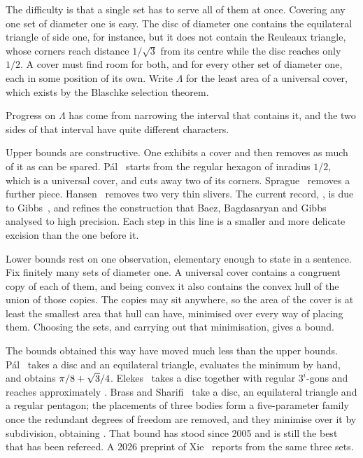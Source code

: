 \documentclass[a4paper,UKenglish,cleveref,autoref,thm-restate,numberwithinsect]{lipics-v2021}
\begin{document}
The difficulty is that a single set has to serve all of them at once. Covering
any one set of diameter one is easy. The disc of diameter one contains the
equilateral triangle of side one, for instance, but it does not contain the
Reuleaux triangle, whose corners reach distance $1/\sqrt3$ from its centre while
the disc reaches only $1/2$. A cover must find room for both, and for every other
set of diameter one, each in some position of its own. Write $\Lambda$ for the
least area of a universal cover, which exists by the Blaschke selection theorem.

Progress on $\Lambda$ has come from narrowing the interval that contains it, and
the two sides of that interval have quite different characters.

Upper bounds are constructive. One exhibits a cover and then removes as much of
it as can be spared. P\'al~\cite{Pal1920} starts from the regular hexagon of inradius
$1/2$, which is a universal cover, and cuts away two of its corners.
Sprague~\cite{Sprague1936} removes a further piece.
Hansen~\cite{Hansen1975,Hansen1992} removes two very thin slivers. The current record,
\GibbsUpper{}, is due to Gibbs~\cite{Gibbs2018}, and refines the construction
that Baez, Bagdasaryan and Gibbs~\cite{BaezBagdasaryanGibbs2015} analysed to high
precision. Each step in this line is a smaller and more delicate excision than
the one before it.

Lower bounds rest on one observation, elementary enough to state in a sentence.
Fix finitely many sets of diameter one. A universal cover contains a congruent
copy of each of them, and being convex it also contains the convex hull of the
union of those copies. The copies may sit anywhere, so the area of the cover is
at least the smallest area that hull can have, minimised over every way of
placing them. Choosing the sets, and carrying out that minimisation, gives a
bound.

The bounds obtained this way have moved much less than the upper bounds. P\'al~\cite{Pal1920}
takes a disc and an equilateral triangle, evaluates the minimum by hand, and
obtains $\pi/8+\sqrt3/4$. Elekes~\cite{Elekes1994} takes a disc together with regular
$3^i$-gons and reaches approximately \ElekesLB{}. Brass and
Sharifi~\cite{BrassSharifi2005} take a disc, an equilateral triangle and a
regular pentagon; the placements of three bodies form a five-parameter family
once the redundant degrees of freedom are removed, and they minimise over it by
subdivision, obtaining
\BSLB{}. That bound has stood since 2005 and is still the best that has been
refereed. A 2026 preprint of Xie~\cite{Xie2026} reports \XieLB{} from the same three
sets.
\end{document}
